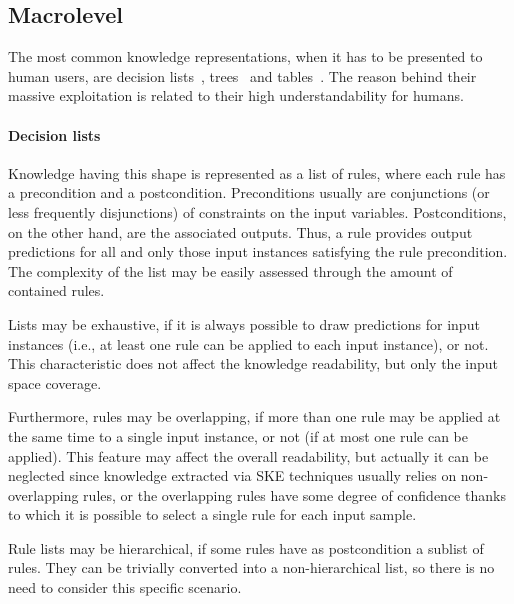 \documentclass[sigconf]{acmart}
\begin{document}
\subsection{Macrolevel}\label{ssec:macro}

The most common knowledge representations, when it has to be presented to human users, are decision lists~\cite{freitas2014comprehensible,huysmans2011empirical}, trees~\cite{quinlan1993c4,breiman1984classification} and tables~\cite{sethi2012kdruleex}.
%
The reason behind their massive exploitation is related to their high understandability for humans.

\paragraph{Decision lists}

Knowledge having this shape is represented as a list of rules, where each rule has a precondition and a postcondition.
%
Preconditions usually are conjunctions (or less frequently disjunctions) of constraints on the input variables.
%
Postconditions, on the other hand, are the associated outputs.
%
Thus, a rule provides output predictions for all and only those input instances satisfying the rule precondition.
%
The complexity of the list may be easily assessed through the amount of contained rules.

Lists may be exhaustive, if it is always possible to draw predictions for input instances (i.e., at least one rule can be applied to each input instance), or not.
%
This characteristic does not affect the knowledge readability, but only the input space coverage.

Furthermore, rules may be overlapping, if more than one rule may be applied at the same time to a single input instance, or not (if at most one rule can be applied).
%
This feature may affect the overall readability, but actually it can be neglected since knowledge extracted via SKE techniques usually relies on non-overlapping rules, or the overlapping rules have some degree of confidence thanks to which it is possible to select a single rule for each input sample.

Rule lists may be hierarchical, if some rules have as postcondition a sublist of rules.
%
They can be trivially converted into a non-hierarchical list, so there is no need to consider this specific scenario.
\end{document}
